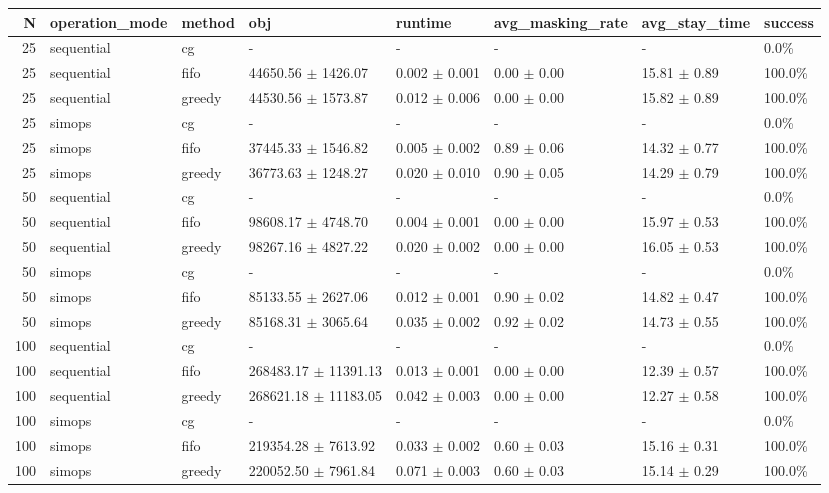 \begin{tabular}{rlllllll}
\toprule
N & operation_mode & method & obj & runtime & avg_masking_rate & avg_stay_time & success \\
\midrule
25 & sequential & cg & - & - & - & - & 0.0\% \\
25 & sequential & fifo & 44650.56 $\pm$ 1426.07 & 0.002 $\pm$ 0.001 & 0.00 $\pm$ 0.00 & 15.81 $\pm$ 0.89 & 100.0\% \\
25 & sequential & greedy & 44530.56 $\pm$ 1573.87 & 0.012 $\pm$ 0.006 & 0.00 $\pm$ 0.00 & 15.82 $\pm$ 0.89 & 100.0\% \\
25 & simops & cg & - & - & - & - & 0.0\% \\
25 & simops & fifo & 37445.33 $\pm$ 1546.82 & 0.005 $\pm$ 0.002 & 0.89 $\pm$ 0.06 & 14.32 $\pm$ 0.77 & 100.0\% \\
25 & simops & greedy & 36773.63 $\pm$ 1248.27 & 0.020 $\pm$ 0.010 & 0.90 $\pm$ 0.05 & 14.29 $\pm$ 0.79 & 100.0\% \\
50 & sequential & cg & - & - & - & - & 0.0\% \\
50 & sequential & fifo & 98608.17 $\pm$ 4748.70 & 0.004 $\pm$ 0.001 & 0.00 $\pm$ 0.00 & 15.97 $\pm$ 0.53 & 100.0\% \\
50 & sequential & greedy & 98267.16 $\pm$ 4827.22 & 0.020 $\pm$ 0.002 & 0.00 $\pm$ 0.00 & 16.05 $\pm$ 0.53 & 100.0\% \\
50 & simops & cg & - & - & - & - & 0.0\% \\
50 & simops & fifo & 85133.55 $\pm$ 2627.06 & 0.012 $\pm$ 0.001 & 0.90 $\pm$ 0.02 & 14.82 $\pm$ 0.47 & 100.0\% \\
50 & simops & greedy & 85168.31 $\pm$ 3065.64 & 0.035 $\pm$ 0.002 & 0.92 $\pm$ 0.02 & 14.73 $\pm$ 0.55 & 100.0\% \\
100 & sequential & cg & - & - & - & - & 0.0\% \\
100 & sequential & fifo & 268483.17 $\pm$ 11391.13 & 0.013 $\pm$ 0.001 & 0.00 $\pm$ 0.00 & 12.39 $\pm$ 0.57 & 100.0\% \\
100 & sequential & greedy & 268621.18 $\pm$ 11183.05 & 0.042 $\pm$ 0.003 & 0.00 $\pm$ 0.00 & 12.27 $\pm$ 0.58 & 100.0\% \\
100 & simops & cg & - & - & - & - & 0.0\% \\
100 & simops & fifo & 219354.28 $\pm$ 7613.92 & 0.033 $\pm$ 0.002 & 0.60 $\pm$ 0.03 & 15.16 $\pm$ 0.31 & 100.0\% \\
100 & simops & greedy & 220052.50 $\pm$ 7961.84 & 0.071 $\pm$ 0.003 & 0.60 $\pm$ 0.03 & 15.14 $\pm$ 0.29 & 100.0\% \\

\end{tabular}

